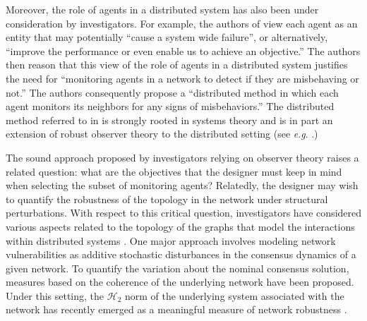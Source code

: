 \documentclass[reqno,8pt]{amsart}
\theoremstyle{definition}
\theoremstyle{remark}
\numberwithin{equation}{section}
\newcommand{\eg}{\textit{e}.\textit{g}. }
\begin{document}
\medskip

Moreover, the role of agents in a distributed system has also been under consideration by investigators. For example, the authors of \cite{shames_agents_2012} view each agent as an entity that may potentially ``cause a system wide failure'', or alternatively, ``improve the performance or even enable us to achieve an objective.'' The authors then reason that this view of the role of agents in a distributed system justifies the need for ``monitoring agents in a network to detect if they are misbehaving or not.''  The authors consequently propose a ``distributed method in which each agent monitors its neighbors for any signs of misbehaviors.''  The distributed method referred to in \cite{shames_agents_2012} is strongly rooted in systems theory and is in part an extension of robust observer theory to the distributed setting (see \eg \cite{teixeira_distributed_2014,shames_distributed_2011,teixeira_networked_2010}.)  

\medskip

The sound approach proposed by investigators relying on observer theory raises a related question: what are the objectives that the designer must keep in mind when selecting the subset of monitoring agents? Relatedly, the designer may wish to quantify the robustness of the topology in the network under structural perturbations. With respect to this critical question, investigators have considered various aspects related to the topology of the graphs that model the interactions within distributed systems \cite{leong_network_2016,Akoglu2015,Dek2004,Summers2015,weimer_distributed_2012,lucchese_distributed_2014,besselink_string_2016,Dinh2015,Dinh2012,Feng2015,Kis2013,rieger_resilient_2012,Van2013,Lamp1982,Bien1989}. One major approach involves modeling network vulnerabilities as additive stochastic disturbances in the consensus dynamics of a given network. To quantify the variation about the nominal consensus solution, measures based on the coherence of the underlying network have been proposed. Under this setting, the $\mathcal{H}_2$ norm of the underlying system associated with the network has recently emerged as a meaningful measure of network robustness \cite{Bam2012,Pat2014,Teg2015,Lin2014}.

\medskip
\end{document}
